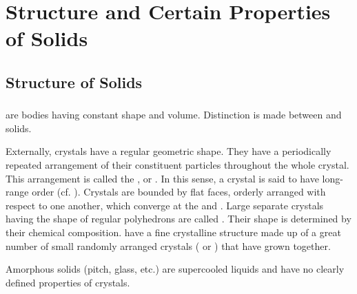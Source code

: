 



\chapter[Structure Of Solids]{Structure and Certain Properties of Solids}
\label{ch-40}

\section{Structure of Solids}
\label{sec-40.1} 

\subsection{}\label{40.1.1}  are bodies having constant shape and volume. Distinction is made between  and  solids.

Externally, crystals have a regular geometric shape. They have
a periodically repeated arrangement of their constituent particles throughout the whole crystal. This arrangement is called the , or . In this sense, a crystal is said to have long-range order (cf. ). Crystals are bounded by flat faces, orderly arranged with respect to one another, which converge at the  and . Large separate crystals having the shape of regular polyhedrons are called . Their shape is determined by their chemical composition.  have a fine crystalline structure made up of a great number of small randomly arranged crystals ( or ) that have grown together.

Amorphous solids (pitch, glass, etc.) are supercooled liquids and have no clearly defined properties of crystals.


